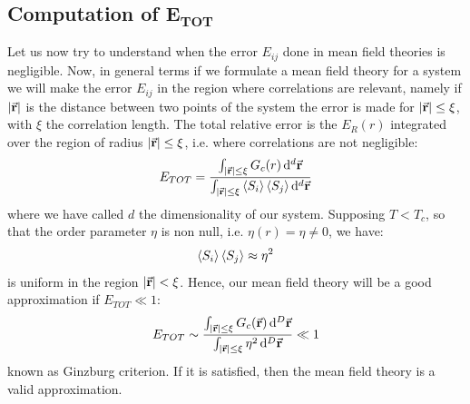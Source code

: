 \documentclass[../main/main.tex]{subfiles}
\begin{document}
\subsection{Computation of \( \pmb{E_{TOT}}  \)}
Let us now try to understand when the error \( E_{ij} \) done in mean field theories is negligible. Now, in general terms if we formulate a mean field theory for a system we will make the error \( E_{ij} \)  in the region where correlations are relevant, namely if \( \abs{\va{r}}  \) is the distance between two points of the system the error is made for \( \abs{\va{r}} \leq \xi  \), with \( \xi  \) the correlation length.  The total relative error is the \( E_R (r)\) integrated over the region of radius \(  \abs{\va{r}} \le \xi  \), i.e. where correlations are not negligible:
\begin{equation}
  E_{TOT} = \frac{\int_{\abs{\va{r}} \le \xi  }^{} G_c (r) \dd[d]{\va{r}}  }{\int_{ \abs{\va{r}} \le \xi  }^{} \expval{S_i} \expval{S_j}  \dd[d]{\va{r}} }
\end{equation}
where we have called \( d \) the dimensionality of our system.
Supposing \( T<T_c \), so that the order parameter \( \eta  \)  is non null, i.e.  \( \eta (r) = \eta \neq 0 \), we have:
\begin{equation*}
   \expval{S_i} \expval{S_j} \approx \eta ^2
\end{equation*}
is uniform in the region \( \abs{\va{r}} < \xi   \). Hence, our mean field theory will be a good approximation if \( E_{TOT} \ll 1 \):
\begin{equation}
  E_{TOT} \sim \frac{\int_{\abs{\va{r}} \le \xi  }^{} G_c (\va{r}) \dd[D]{\va{r}}  }{\int_{ \abs{\va{r}} \le \xi  }^{ } \eta ^2 \dd[D]{\va{r}}  } \ll 1
  \label{eq:16_2}
\end{equation}
known as Ginzburg criterion. If it is satisfied, then the mean field theory is a valid approximation.
\end{document}
